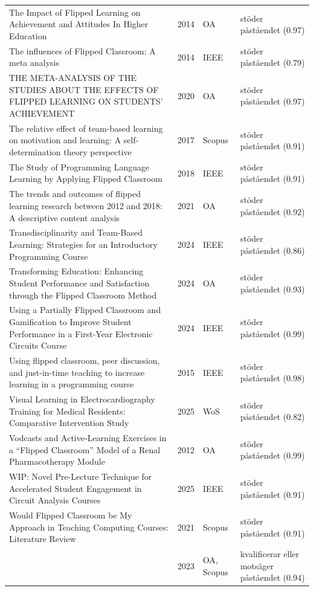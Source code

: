 \begin{longtable}{@{}%
  >{\raggedright\arraybackslash}p{}c%
  >{\raggedright\arraybackslash}p{}%
  >{\raggedright\arraybackslash}p{}@{}}
The Impact of Flipped Learning on Achievement and Attitudes In Higher Education & 2014 & OA & stöder påståendet (0.97) \\
The influences of Flipped Classroom: A meta analysis & 2014 & IEEE & stöder påståendet (0.79) \\
THE META-ANALYSIS OF THE STUDIES ABOUT THE EFFECTS OF FLIPPED LEARNING ON STUDENTS' ACHIEVEMENT & 2020 & OA & stöder påståendet (0.97) \\
The relative effect of team-based learning on motivation and learning: A self-determination theory perspective & 2017 & Scopus & stöder påståendet (0.91) \\
The Study of Programming Language Learning by Applying Flipped Classroom & 2018 & IEEE & stöder påståendet (0.91) \\
The trends and outcomes of flipped learning research between 2012 and 2018: A descriptive content analysis & 2021 & OA & stöder påståendet (0.92) \\
Transdisciplinarity and Team-Based Learning: Strategies for an Introductory Programming Course & 2024 & IEEE & stöder påståendet (0.86) \\
Transforming Education: Enhancing Student Performance and Satisfaction through the Flipped Classroom Method & 2024 & OA & stöder påståendet (0.93) \\
Using a Partially Flipped Classroom and Gamification to Improve Student Performance in a First-Year Electronic Circuits Course & 2024 & IEEE & stöder påståendet (0.99) \\
Using flipped classroom, peer discussion, and just-in-time teaching to increase learning in a programming course & 2015 & IEEE & stöder påståendet (0.98) \\
Visual Learning in Electrocardiography Training for Medical Residents: Comparative Intervention Study & 2025 & WoS & stöder påståendet (0.82) \\
Vodcasts and Active-Learning Exercises in a ``Flipped Classroom'' Model of a Renal Pharmacotherapy Module & 2012 & OA & stöder påståendet (0.99) \\
WIP: Novel Pre-Lecture Technique for Accelerated Student Engagement in Circuit Analysis Courses & 2025 & IEEE & stöder påståendet (0.91) \\
Would Flipped Classroom be My Approach in Teaching Computing Courses: Literature Review & 2021 & Scopus & stöder påståendet (0.91) \\
 & 2023 & OA, Scopus & kvalificerar eller motsäger påståendet (0.94) \\

\end{longtable}
